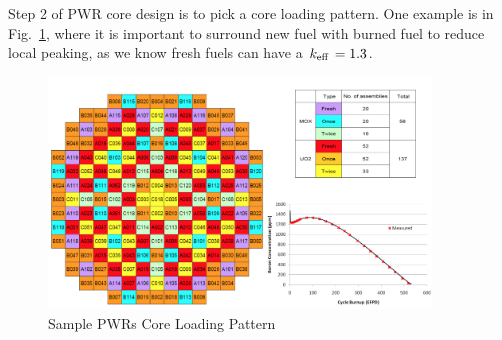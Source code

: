 \documentclass{school-22.211-notes}
\begin{document}
Step 2 of PWR core design is to pick a core loading pattern. One example is in Fig.~\ref{PWR-core-loading}, where it is important to surround new fuel with burned fuel to reduce local peaking, as we know fresh fuels can have a $\left. k_{\mathrm{eff}} \right. = 1.3$. 

\begin{figure}[ht]
  \centering
  \includegraphics[width=4in]{images/design/PWR-core-loading.png}
  \caption{Sample PWRs Core Loading Pattern} \label{PWR-core-loading}
\end{figure}
\end{document}
